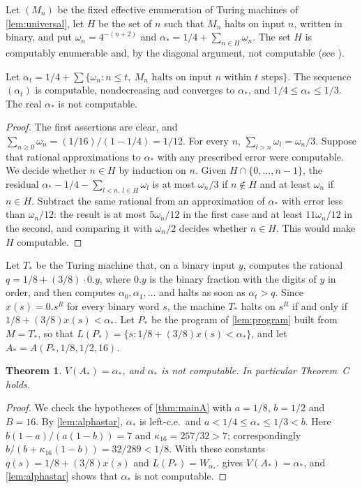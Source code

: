 \documentclass[11pt]{article}
\theoremstyle{plain}
\newtheorem{theorem}{Theorem}[section]
\theoremstyle{definition}
\theoremstyle{remark}
\begin{document}
Let $(M_n)$ be the fixed effective enumeration of Turing machines of \cref{lem:universal}, let $H$ be the set of $n$ such that $M_n$ halts on input $n$, written in binary, and put $\omega_n=4^{-(n+2)}$ and $\alpha_*=1/4+\sum_{n\in H}\omega_n$. The set $H$ is computably enumerable and, by the diagonal argument, not computable (see \cite{Soa16}).

\begin{lemma}\label{lem:alphastar}
Let $\alpha_t=1/4+\sum\{\omega_n:n\le t,\ M_n\text{ halts on input }n\text{ within }t\text{ steps}\}$. The sequence $(\alpha_t)$ is computable, nondecreasing and converges to $\alpha_*$, and $1/4\le\alpha_*\le1/3$. The real $\alpha_*$ is not computable.
\end{lemma}

\begin{proof}
The first assertions are clear, and $\sum_{n\ge0}\omega_n=(1/16)/(1-1/4)=1/12$. For every $n$, $\sum_{l>n}\omega_l=\omega_n/3$. Suppose that rational approximations to $\alpha_*$ with any prescribed error were computable. We decide whether $n\in H$ by induction on $n$. Given $H\cap\{0,\dots,n-1\}$, the residual $\alpha_*-1/4-\sum_{l<n,\,l\in H}\omega_l$ is at most $\omega_n/3$ if $n\notin H$ and at least $\omega_n$ if $n\in H$. Subtract the same rational from an approximation of $\alpha_*$ with error less than $\omega_n/12$: the result is at most $5\omega_n/12$ in the first case and at least $11\omega_n/12$ in the second, and comparing it with $\omega_n/2$ decides whether $n\in H$. This would make $H$ computable.
\end{proof}

Let $T_*$ be the Turing machine that, on a binary input $y$, computes the rational $q=1/8+(3/8)\cdot0.y$, where $0.y$ is the binary fraction with the digits of $y$ in order, and then computes $\alpha_0,\alpha_1,\dots$ and halts as soon as $\alpha_t>q$. Since $x(s)=0.s^R$ for every binary word $s$, the machine $T_*$ halts on $s^R$ if and only if $1/8+(3/8)x(s)<\alpha_*$. Let $P_*$ be the program of \cref{lem:program} built from $M=T_*$, so that $L(P_*)=\{s:1/8+(3/8)x(s)<\alpha_*\}$, and let $A_*=A(P_*,1/8,1/2,16)$.

\begin{theorem}\label{thm:mainC}
$V(A_*)=\alpha_*$, and $\alpha_*$ is not computable. In particular Theorem~C holds.
\end{theorem}

\begin{proof}
We check the hypotheses of \cref{thm:mainA} with $a=1/8$, $b=1/2$ and $B=16$. By \cref{lem:alphastar}, $\alpha_*$ is left-c.e.\ and $a<1/4\le\alpha_*\le1/3<b$. Here $b(1-a)/(a(1-b))=7$ and $\kappa_{16}=257/32>7$; correspondingly $b/(b+\kappa_{16}(1-b))=32/289<1/8$. With these constants $q(s)=1/8+(3/8)x(s)$ and $L(P_*)=W_{\alpha_*}$.  gives $V(A_*)=\alpha_*$, and \cref{lem:alphastar} shows that $\alpha_*$ is not computable.
\end{proof}
\end{document}
